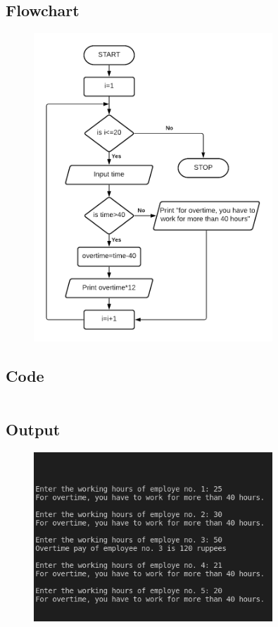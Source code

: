 \documentclass[12pt]{article}
\begin{document}
\subsection{Flowchart}
\begin{figure}[h]
    \centering
    \includegraphics[width=0.8\textwidth]{Flowchart09.png}
\end{figure}
\newpage
\subsection{Code}
\inputminted{c}{q9.c}
\subsection{Output}
\begin{figure}[h]
    \centering
    \includegraphics[width=0.8\textwidth]{9.png}
\end{figure}
\newpage
\end{document}

